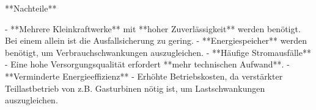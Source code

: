 \begin{markdown}
**Nachteile**

- **Mehrere Kleinkraftwerke** mit **hoher Zuverlässigkeit** werden benötigt. Bei einem allein ist die Ausfallsicherung zu gering.
- **Energiespeicher** werden benötigt, um Verbrauchschwankungen auszugleichen.
- **Häufige Stromausfälle** - Eine hohe Versorgungsqualität erfordert **mehr technischen Aufwand**.
- **Verminderte Energieeffizienz** -  Erhöhte Betriebskosten, da verstärkter Teillastbetrieb von z.B. Gasturbinen nötig ist, um Lastschwankungen auszugleichen.

\end{markdown}